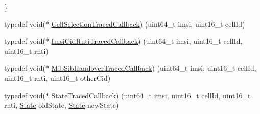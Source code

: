 \begin{DoxyCompactItemize}
 \}
\item 
typedef void($\ast$ \hyperlink{classns3_1_1LteUeRrc_a39dd1fb0d6ae8316f5f7edd8bfa6608b}{Cell\+Selection\+Traced\+Callback}) (uint64\+\_\+t imsi, uint16\+\_\+t cell\+Id)
\item 
typedef void($\ast$ \hyperlink{classns3_1_1LteUeRrc_aaad6e1912d9983c60502641c4af5c362}{Imsi\+Cid\+Rnti\+Traced\+Callback}) (uint64\+\_\+t imsi, uint16\+\_\+t cell\+Id, uint16\+\_\+t rnti)
\item 
typedef void($\ast$ \hyperlink{classns3_1_1LteUeRrc_a27ac09f9d441827ae9444de507ab184a}{Mib\+Sib\+Handover\+Traced\+Callback}) (uint64\+\_\+t imsi, uint16\+\_\+t cell\+Id, uint16\+\_\+t rnti, uint16\+\_\+t other\+Cid)
\item 
typedef void($\ast$ \hyperlink{classns3_1_1LteUeRrc_a0563fcfccd2e0e58175a6edf11899f94}{State\+Traced\+Callback}) (uint64\+\_\+t imsi, uint16\+\_\+t cell\+Id, uint16\+\_\+t rnti, \hyperlink{classns3_1_1LteUeRrc_a241012c291e75681150c9214e11f6145}{State} old\+State, \hyperlink{classns3_1_1LteUeRrc_a241012c291e75681150c9214e11f6145}{State} new\+State)
\end{DoxyCompactItemize}
